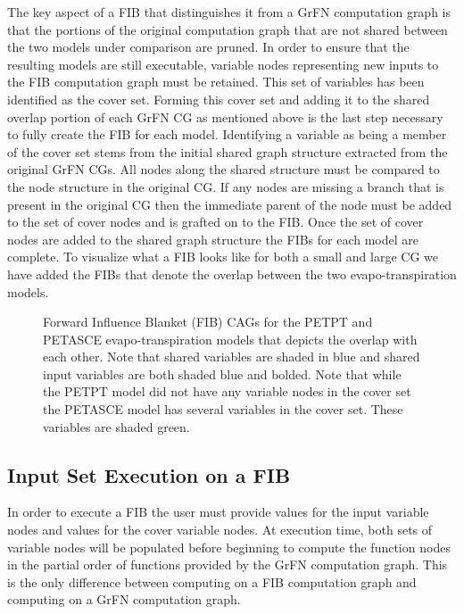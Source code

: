 The key aspect of a FIB that distinguishes it from a GrFN computation graph is that the portions of the original computation graph that are not shared between the two models under comparison are pruned.
In order to ensure that the resulting models are still executable, variable nodes representing new inputs to the FIB computation graph must be retained.
This set of variables has been identified as the cover set.
Forming this cover set and adding it to the shared overlap portion of each GrFN CG as mentioned above is the last step necessary to fully create the FIB for each model.
Identifying a variable as being a member of the cover set stems from the initial shared graph structure extracted from the original GrFN CGs.
All nodes along the shared structure must be compared to the node structure in the original CG.
If any nodes are missing a branch that is present in the original CG then the immediate parent of the node must be added to the set of cover nodes and is grafted on to the FIB.
Once the set of cover nodes are added to the shared graph structure the FIBs for each model are complete.
To visualize what a FIB looks like for both a small and large CG we have added the FIBs that denote the overlap between the two evapo-transpiration models.

\FloatBarrier
\begin{figure}[!tbp]
  \centering

  \caption[Forward Influence Blanket CAG Examples]{Forward Influence Blanket (FIB) CAGs for the PETPT and PETASCE evapo-transpiration models that depicts the overlap with each other. Note that shared variables are shaded in blue and shared input variables are both shaded blue and bolded. Note that while the PETPT model did not have any variable nodes in the cover set the PETASCE model has several variables in the cover set. These variables are shaded green.}
\end{figure}
\FloatBarrier

\subsection{Input Set Execution on a FIB\label{sec:fib_exec}}
In order to execute a FIB the user must provide values for the input variable nodes and values for the cover variable nodes. At execution time, both sets of variable nodes will be populated before beginning to compute the function nodes in the partial order of functions provided by the GrFN computation graph. This is the only difference between computing on a FIB computation graph and computing on a GrFN computation graph.

